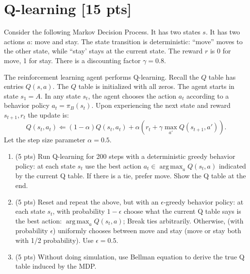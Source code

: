 \documentclass[a4paper]{article}
\theoremstyle{definition}
\DeclareMathOperator*{\argmax}{arg\,max}
\begin{document}
\section{Q-learning [15 pts]}
Consider the following Markov Decision Process.
It has two states $s$. It has two actions $a$: move and stay. The state transition is deterministic: ``move'' moves to the other state, while ``stay' stays at the current state. The reward $r$ is 0 for move,  1 for stay. There is a discounting factor $\gamma=0.8$.
\\


The reinforcement learning agent performs Q-learning.  Recall the $Q$ table has entries $Q(s,a)$. The $Q$ table is initialized with all zeros. The agent starts in state $s_1=A$. In any state $s_t$, the agent chooses the action $a_t$ according to a behavior policy $a_t = \pi_B(s_t)$. Upon experiencing the next state and reward $s_{t+1}, r_t$ the update is:
$$Q(s_t, a_t) \Leftarrow (1-\alpha) Q(s_t, a_t) + \alpha \left( r_t + \gamma \max_{a'} Q(s_{t+1}, a') \right).$$
Let the step size parameter $\alpha=0.5$.

\begin{enumerate}
\item (5 pts) Run Q-learning for 200 steps with a deterministic greedy behavior policy: at each state $s_t$ use the best action $a_t \in \argmax_a Q(s_t,a)$ indicated by the current Q table. If there is a tie, prefer move. Show the Q table at the end.

\item (5 pts) Reset and repeat the above, but with an $\epsilon$-greedy behavior policy: at each state $s_t$, with probability $1-\epsilon$ choose what the current Q table says is the best action: $\argmax_a Q(s_t,a)$; Break ties arbitrarily. Otherwise, (with probability $\epsilon$) uniformly chooses between move and stay (move or stay both with 1/2 probability). Use $\epsilon=0.5$.

\item (5 pts) Without doing simulation, use Bellman equation to derive the true Q table induced by the MDP.

\end{enumerate}
\end{document}

